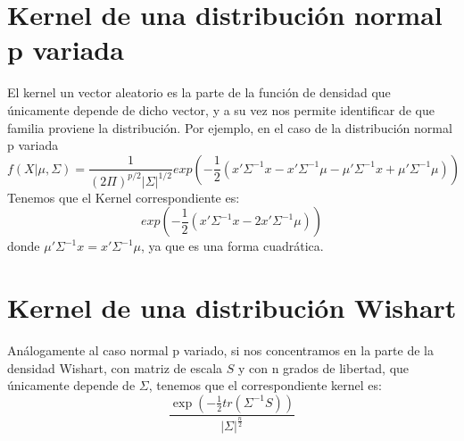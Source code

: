 \documentclass[11pt]{book}
\begin{document}
\section{Kernel de una distribución normal p variada}
El kernel un vector aleatorio es la parte de la función de densidad que únicamente depende de dicho vector, y a su vez nos permite identificar de que familia proviene la distribución. Por ejemplo, en el caso de la distribución normal p variada
\begin{equation*}
f(X|\mu,\Sigma)=\dfrac{1}{(2\Pi)^{p/2}|\Sigma|^{1/2}}exp(-\dfrac{1}{2}(x'\Sigma^{-1}x - x'\Sigma^{-1}\mu -\mu'\Sigma^{-1}x+\mu'\Sigma^{-1}\mu))
\end{equation*}
Tenemos que el Kernel correspondiente es:
\begin{equation*}
exp(-\dfrac{1}{2}(x'\Sigma^{-1}x -2x'\Sigma^{-1}\mu))
\end{equation*}
donde $\mu'\Sigma^{-1}x=x'\Sigma^{-1}\mu$, ya que es una forma cuadrática.

\section{Kernel de una distribución Wishart}
Análogamente al caso normal p variado, si nos concentramos en la parte de la densidad Wishart, con matriz de escala $S$ y con n grados de libertad, que únicamente depende de $\Sigma$, tenemos que el correspondiente kernel es:
\begin{equation*}
\dfrac{\exp(-\frac{1}{2}tr(\Sigma^{-1}S))}{|\Sigma|^{\frac{n}{2}}}
\end{equation*}
\end{document}
